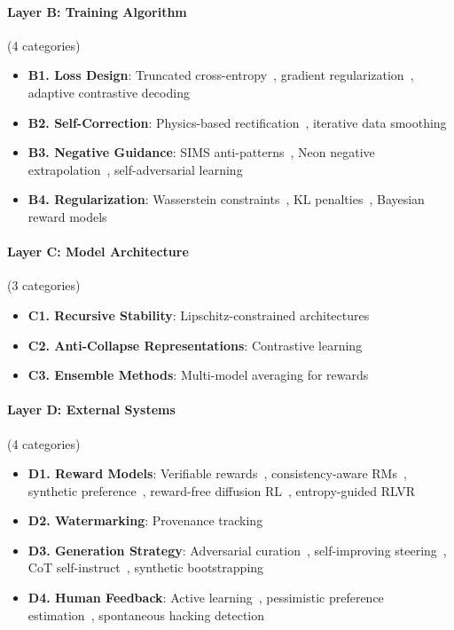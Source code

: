 \documentclass[11pt]{article}
\begin{document}
\paragraph{Layer B: Training Algorithm} (4 categories)
\begin{itemize}[nosep]
    \item \textbf{B1. Loss Design}: Truncated cross-entropy~\citep{fortifai2025}, gradient regularization~\citep{gradientreg2026}, adaptive contrastive decoding~\citep{adaptive2024}
    \item \textbf{B2. Self-Correction}: Physics-based rectification~\citep{selfcorrecting2024}, iterative data smoothing~\citep{ids2024}
    \item \textbf{B3. Negative Guidance}: SIMS anti-patterns~\citep{sims2024}, Neon negative extrapolation~\citep{neon2025}, self-adversarial learning~\citep{sal2020}
    \item \textbf{B4. Regularization}: Wasserstein constraints~\citep{diversegrpo2025}, KL penalties~\citep{constrained2023}, Bayesian reward models~\citep{bayesianrm2024}
\end{itemize}

\paragraph{Layer C: Model Architecture} (3 categories)
\begin{itemize}[nosep]
    \item \textbf{C1. Recursive Stability}: Lipschitz-constrained architectures~\citep{recursive2025,minimal2026,iconE2026}
    \item \textbf{C2. Anti-Collapse Representations}: Contrastive learning~\citep{wang2020understanding,gao2022contrastive,jing2019understanding}
    \item \textbf{C3. Ensemble Methods}: Multi-model averaging for rewards~\citep{herding2023,diverserm2024,efficientrm2024}
\end{itemize}

\paragraph{Layer D: External Systems} (4 categories)
\begin{itemize}[nosep]
    \item \textbf{D1. Reward Models}: Verifiable rewards~\citep{rlvr2025}, consistency-aware RMs~\citep{consistrm2026}, synthetic preference~\citep{westofn2024}, reward-free diffusion RL~\citep{gardo2025}, entropy-guided RLVR~\citep{cure2025}
    \item \textbf{D2. Watermarking}: Provenance tracking~\citep{sok2024watermark,stegano2026,datawm2024}
    \item \textbf{D3. Generation Strategy}: Adversarial curation~\citep{advcurated2025}, self-improving steering~\citep{selfsteer2025}, CoT self-instruct~\citep{cotsi2025}, synthetic bootstrapping~\citep{sbp2025}
    \item \textbf{D4. Human Feedback}: Active learning~\citep{dualal2024}, pessimistic preference estimation~\citep{mitpref2025}, spontaneous hacking detection~\citep{spontaneous2024}
\end{itemize}
\end{document}

